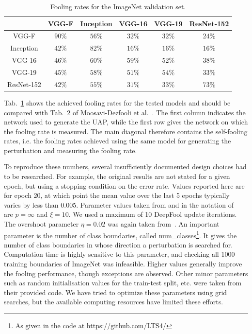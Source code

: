 \documentclass[runningheads]{llncs}
\begin{document}
\begin{table}[htbp]
\centering
\caption{Fooling rates for the ImageNet validation set.}
\begin{tabular}{|c|c|c|c|c|c|}
\hline

			& VGG-F		&	Inception	&	VGG-16		&	VGG-19		&	ResNet-152	\\ \hline
VGG-F		& $90\%$	&	$56\%$		&	$32\%$		&	$32\%$		& 	$24\%$		\\
Inception	& $42\%$	&	$82\%$		&	$16\%$		&	$16\%$		& 	$16\%$	\\
VGG-16		& $46\%$	&	$60\%$		&	$59\%$		&	$52\%$		& 	$38\%$	\\
VGG-19		& $45\%$	&	$58\%$		&	$51\%$		&	$54\%$		& 	$33\%$	\\
ResNet-152	& $42\%$	&	$55\%$		&	$31\%$		&	$33\%$		& 	$73\%$	\\
\hline 
\end{tabular}
\label{tbl_stoerraten_reprod_kreuz_linf}
\end{table}

Tab.~\ref{tbl_stoerraten_reprod_kreuz_linf} shows the achieved fooling rates for the tested models and should be compared with Tab.~2 of Moosavi-Dezfooli et al.~\cite{moosavidezfooli_universal_2017}. The first column indicates the network used to generate the UAP, while the first row gives the network on which the fooling rate is measured. The main diagonal therefore contains the self-fooling rates, i.e. the fooling rates achieved using the same model for generating the perturbation and measuring the fooling rate. 

To reproduce these numbers, several insufficiently documented design choices had to be researched. For example, the original results are not stated for a given epoch, but using a stopping condition on the error rate. Values reported here are for epoch 20, at which point the mean value over the last 5 epochs typically varies by less than 0.005. Parameter values taken from and in the notation of~\cite{moosavi-dezfooli_deepfool_2016} are \(p=\infty\) and \(\xi=10\). We used a maximum of 10 DeepFool update iterations. The overshoot parameter \(\eta=0.02\) was again taken from~\cite{moosavi-dezfooli_deepfool_2016}. 
An important parameter is the number of class boundaries, called num\_classes\footnote{As given in the code at https://github.com/LTS4/}. It gives the number of class boundaries in whose direction a perturbation is searched for. Computation time is highly sensitive to this parameter, and checking all 1000 training boundaries of ImageNet was infeasible. Higher values generally improve the fooling performance, though exceptions are observed. 
Other minor parameters such as random initialisation values for the train-test split, etc. were taken from their provided code. We have tried to optimize these parameters using grid searches, but the available computing resources have limited these efforts. 
\end{document}
